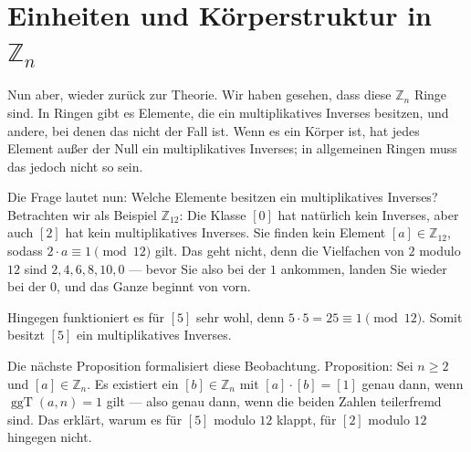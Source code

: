\section{Einheiten und Körperstruktur in \texorpdfstring{$\mathbb{Z}_n$}{Zn}}

\begin{spoken-clean}[00:25:21 - 00:27:46]
Nun aber, wieder zurück zur Theorie. Wir haben gesehen, dass diese $\mathbb{Z}_n$ Ringe sind. In Ringen gibt es Elemente, die ein multiplikatives Inverses besitzen, und andere, bei denen das nicht der Fall ist. Wenn es ein Körper ist, hat jedes Element außer der Null ein multiplikatives Inverses; in allgemeinen Ringen muss das jedoch nicht so sein.

Die Frage lautet nun: Welche Elemente besitzen ein multiplikatives Inverses? Betrachten wir als Beispiel $\mathbb{Z}_{12}$: Die Klasse $[0]$ hat natürlich kein Inverses, aber auch $[2]$ hat kein multiplikatives Inverses. Sie finden kein Element $[a] \in \mathbb{Z}_{12}$, sodass $2 \cdot a \equiv 1 \pmod{12}$ gilt. Das geht nicht, denn die Vielfachen von $2$ modulo $12$ sind $2, 4, 6, 8, 10, 0$ --- bevor Sie also bei der $1$ ankommen, landen Sie wieder bei der $0$, und das Ganze beginnt von vorn.

Hingegen funktioniert es für $[5]$ sehr wohl, denn $5 \cdot 5 = 25 \equiv 1 \pmod{12}$. Somit besitzt $[5]$ ein multiplikatives Inverses.

Die nächste Proposition formalisiert diese Beobachtung. Proposition: Sei $n \ge 2$ und $[a] \in \mathbb{Z}_n$. Es existiert ein $[b] \in \mathbb{Z}_n$ mit $[a] \cdot [b] = [1]$ genau dann, wenn $\operatorname{ggT}(a, n) = 1$ gilt --- also genau dann, wenn die beiden Zahlen teilerfremd sind. Das erklärt, warum es für $[5]$ modulo $12$ klappt, für $[2]$ modulo $12$ hingegen nicht.
\end{spoken-clean}

\begin{math-stroke}
\end{math-stroke}

